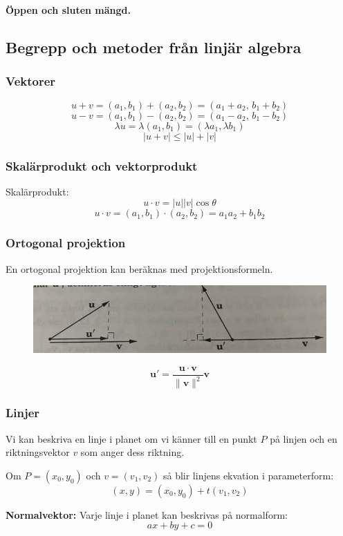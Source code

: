 \documentclass[a4paper,12pt]{article}
\begin{document}
\textbf{Öppen och sluten mängd.}

\subsection{Begrepp och metoder från linjär algebra}

\subsubsection*{Vektorer}
\[
u + v = (a_1,b_1) + (a_2,b_2) = (a_1+a_2, \, b_1+b_2)
\]
\[
u - v = (a_1,b_1) - (a_2,b_2) = (a_1-a_2, \, b_1-b_2)
\]
\[
\lambda u = \lambda (a_1, b_1) = (\lambda a_1, \lambda b_1)
\]
\[
|u+v| \leq |u| + |v|
\]

\subsubsection*{Skalärprodukt och vektorprodukt}
Skalärprodukt:
\[
u \cdot v = |u||v|\cos\theta
\]
\[
u \cdot v = (a_1, b_1)\cdot(a_2, b_2) = a_1a_2 + b_1b_2
\]

\subsubsection*{Ortogonal projektion}
En ortogonal projektion kan beräknas med projektionsformeln.
\begin{figure}[H]
  \centering
  \includegraphics[width=1\textwidth]{ortogonalprojektion.png}
\end{figure}
\[
    \mathbf{u'} =  \frac{\mathbf{u} \cdot \mathbf{v}}{\|\mathbf{v}\|^2} \mathbf{v}
\]

\subsubsection*{Linjer}
Vi kan beskriva en linje i planet om vi känner till en punkt $P$ på linjen och en riktningsvektor $v$ som anger dess riktning.  

Om $P=(x_0, y_0)$ och $v = (v_1, v_2)$ så blir linjens ekvation i parameterform:
\[
(x, y) = (x_0, y_0) + t(v_1, v_2)
\]

\textbf{Normalvektor:}  
Varje linje i planet kan beskrivas på normalform:
\[
ax + by + c = 0
\]
\end{document}
